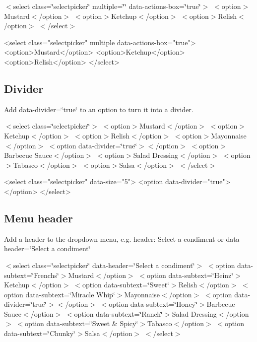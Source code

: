  $<$select class=\char`\"{}selectpicker\char`\"{} multiple=\char`\"{}\char`\"{} data-\/actions-\/box=\char`\"{}true\char`\"{}$>$ $<$option$>$Mustard$<$/option$>$ $<$option$>$Ketchup$<$/option$>$ $<$option$>$Relish$<$/option$>$ $<$/select$>$ 


\begin{DoxyCode}
<select class="selectpicker" multiple data-actions-box="true">
  <option>Mustard</option>
  <option>Ketchup</option>
  <option>Relish</option>
</select>
\end{DoxyCode}


\subsection*{Divider}

Add {\ttfamily data-\/divider=\char`\"{}true\char`\"{}} to an option to turn it into a divider.

 $<$select class=\char`\"{}selectpicker\char`\"{}$>$ $<$option$>$Mustard$<$/option$>$ $<$option$>$Ketchup$<$/option$>$ $<$option$>$Relish$<$/option$>$ $<$option$>$Mayonnaise$<$/option$>$ $<$option data-\/divider=\char`\"{}true\char`\"{}$>$$<$/option$>$ $<$option$>$Barbecue Sauce$<$/option$>$ $<$option$>$Salad Dressing$<$/option$>$ $<$option$>$Tabasco$<$/option$>$ $<$option$>$Salsa$<$/option$>$ $<$/select$>$ 


\begin{DoxyCode}
<select class="selectpicker" data-size="5">
  <option data-divider="true"></option>
</select>
\end{DoxyCode}


\subsection*{Menu header}

Add a header to the dropdown menu, e.\+g. {\ttfamily header\+: \textquotesingle{}Select a condiment\textquotesingle{}} or {\ttfamily data-\/header=\char`\"{}\+Select a condiment\char`\"{}}

  $<$select class=\char`\"{}selectpicker\char`\"{} data-\/header=\char`\"{}\+Select a condiment\char`\"{}$>$ $<$option data-\/subtext=\char`\"{}\+French\textquotesingle{}s\char`\"{}$>$Mustard$<$/option$>$ $<$option data-\/subtext=\char`\"{}\+Heinz\char`\"{}$>$Ketchup$<$/option$>$ $<$option data-\/subtext=\char`\"{}\+Sweet\char`\"{}$>$Relish$<$/option$>$ $<$option data-\/subtext=\char`\"{}\+Miracle Whip\char`\"{}$>$Mayonnaise$<$/option$>$ $<$option data-\/divider=\char`\"{}true\char`\"{}$>$$<$/option$>$ $<$option data-\/subtext=\char`\"{}\+Honey\char`\"{}$>$Barbecue Sauce$<$/option$>$ $<$option data-\/subtext=\char`\"{}\+Ranch\char`\"{}$>$Salad Dressing$<$/option$>$ $<$option data-\/subtext=\char`\"{}\+Sweet \& Spicy\char`\"{}$>$Tabasco$<$/option$>$ $<$option data-\/subtext=\char`\"{}\+Chunky\char`\"{}$>$Salsa$<$/option$>$ $<$/select$>$  


